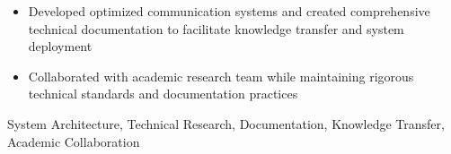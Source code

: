 \begin{experiences}
{{\begin{itemize}
                        \item Developed optimized communication systems and created comprehensive technical documentation to facilitate knowledge transfer and system deployment
                        \item Collaborated with academic research team while maintaining rigorous technical standards and documentation practices
                      \end{itemize}
                    }
                    {System Architecture, Technical Research, Documentation, Knowledge Transfer, Academic Collaboration}
  \emptySeparator}

\end{experiences}
